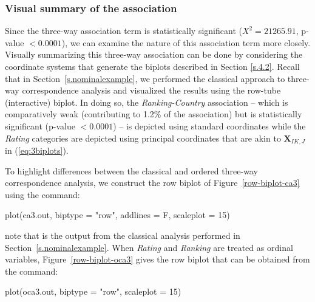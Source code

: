 \subsubsection{Visual summary of the association}

Since the three-way association term is statistically significant ($X^2 = 21265.91$, p-value $< 0.0001$), we can examine the nature of this association term more closely. Visually summarizing this three-way association can be done by considering the coordinate systems that generate the biplots described in Section \ref{s.4.2}. Recall that in Section~\ref{s.nominalexample}, we performed the classical approach to three-way correspondence analysis and visualized the results using the row-tube (interactive) biplot. In doing so, the {\it Ranking-Country} association – which is comparatively weak (contributing to 1.2\% of the association) but is statistically significant (p-value $< 0.0001$) – is depicted using standard coordinates while the {\it Rating} categories are depicted using principal coordinates that are akin to $\mathbf{X}_{IK, J}$ in (\ref{eq:3biplots}). 

To highlight  differences between the classical and ordered three-way correspondence analysis, we construct the row biplot of Figure~\ref{row-biplot-ca3}  using the command:

\begin{example}
plot(ca3.out, biptype = "row",  addlines = F,  scaleplot = 15)
\end{example}

note that  is the output from the classical analysis performed in Section~\ref{s.nominalexample}.  When {\it Rating} and {\it Ranking} are treated as ordinal variables, Figure~\ref{row-biplot-oca3} gives the row biplot that can be obtained from the command:

\begin{example}
plot(oca3.out, biptype = "row",  scaleplot = 15)
\end{example}



